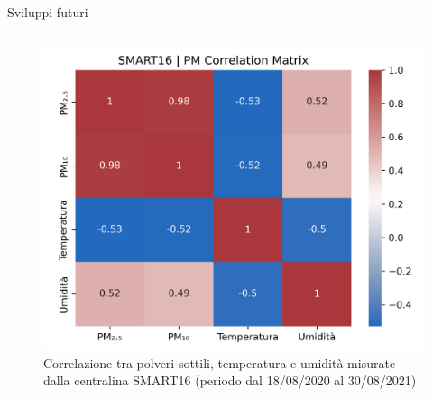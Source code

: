 \begin{frame}{Sviluppi futuri}
\begin{columns}
\begin{column}{0.45\textwidth}
\begin{figure}[H]
\centering
\captionsetup{justification=centering}
\includegraphics[width=\textwidth]{images/corr}
\caption{Correlazione tra polveri sottili, temperatura e umidità misurate dalla centralina SMART16 (periodo dal 18/08/2020 al 30/08/2021)}
\end{figure}
\end{column}

\end{columns}
\end{frame}

